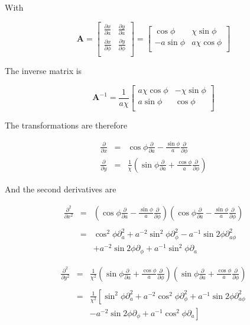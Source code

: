 \documentclass[apj]{emulateapj}
\newcommand{\pderiv}[2]{\frac{\partial #1}{\partial #2}}
\newcommand{\pderivn}[3]{\frac{\partial^{#3} #1}{\partial #2^{#3}}}
\newcommand{\vt}[1]{\mathbf{#1}}       %
\newcommand{\beq}{\begin{equation}}
\newcommand{\eeq}{\end{equation}}
\newcommand{\beqn}{\begin{eqnarray}}
\newcommand{\eeqn}{\end{eqnarray}}
\begin{document}
With 

\beq
\vt{A} = \left[\begin{array}{cc}
\pderiv{x}{a}  & \pderiv{y}{a}  \\
\pderiv{x}{\phi}  & \pderiv{y}{\phi} \\
\end{array}\right] = \left[\begin{array}{cc}
\cos\phi  & \chi\sin\phi  \\
-a\sin\phi  & a\chi\cos\phi \\
\end{array}\right] 
\eeq

The inverse matrix is 

\beq
\vt{A}^{-1} = \frac{1}{a\chi} \left[\begin{array}{cc}
a\chi\cos\phi  & -\chi\sin\phi  \\
a\sin\phi  & \cos\phi \\
\end{array}\right]  
\eeq

The transformations are therefore

\beqn
\pderiv{}{x} &=& \cos\phi \pderiv{}{a} - \frac{\sin\phi}{a} \pderiv{}{\phi} \\
\pderiv{}{y} &=& \frac{1}{\chi}\left(\sin\phi \pderiv{}{a} + \frac{\cos\phi}{a} \pderiv{}{\phi} \right)
\eeqn

And the second derivatives are 

\beqn
\pderivn{}{x}{2} &=& \left(\cos\phi \pderiv{}{a} - \frac{\sin\phi}{a}
  \pderiv{}{\phi}\right) \left(\cos\phi \pderiv{}{a} -
  \frac{\sin\phi}{a} \pderiv{}{\phi}\right) \nonumber \\ \\
&=& \cos^2\phi\partial^2_a + a^{-2}\sin^2\phi \partial^2_\phi -
a^{-1}\sin 2\phi \partial^2_{a\phi} \nonumber \\
&&+ a^{-2}\sin 2\phi\partial_\phi +
a^{-1}\sin^2\phi \partial_a 
\eeqn

\beqn
\pderivn{}{y}{2} &=& \frac{1}{\chi^2}\left(\sin\phi \pderiv{}{a} +
  \frac{\cos\phi}{a} \pderiv{}{\phi} \right) \left(\sin\phi
  \pderiv{}{a} + \frac{\cos\phi}{a} \pderiv{}{\phi} \right) \nonumber
\\ \\
&=& \frac{1}{\chi^2}\left[ \sin^2\phi \partial^2_a +
  a^{-2}\cos^2\phi \partial^2_\phi + a^{-1}\sin
  2\phi \partial^2_{a\phi}\right. \nonumber \\
&&\left.- a^{-2}\sin 2\phi \partial_\phi +
  a^{-1}\cos^2\phi \partial_a \right] 
\eeqn
\end{document}
